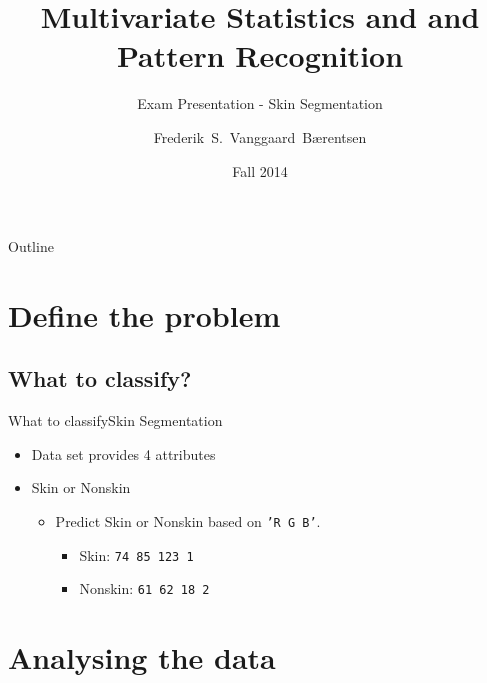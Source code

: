 \documentclass{beamer}
\title{Multivariate Statistics and and Pattern Recognition}
\subtitle{Exam Presentation - Skin Segmentation}
\author{Frederik~S.~Vanggaard~B\ae rentsen}
\institute[Aalborg University - Copenhagen] %
{
  School of Information, Communication and Technology\\
  Aalborg University - Copenhagen}
\date{Fall 2014}
\begin{document}
\begin{frame}
  \titlepage
\end{frame}

\begin{frame}{Outline}
  \tableofcontents
\end{frame}




\section{Define the problem}

\subsection{What to classify?}

\begin{frame}{What to classify}{Skin Segmentation}
  \begin{itemize}
  \item {
    Data set provides 4 attributes
  }
  \item {
    Skin or Nonskin
    \pause
    \begin{itemize}
        \item Predict Skin or Nonskin based on \texttt{'R G B'}. 
        \pause
        \begin{itemize}
            \item Skin: \texttt{74 85 123 1}
            \item Nonskin: \texttt{61 62 18 2}
        \end{itemize}
    \end{itemize}
  }
  \end{itemize}
\end{frame}

\section{Analysing the data}
\end{document}
